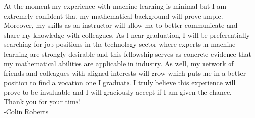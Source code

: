 \documentclass{article}
\begin{document}
At the moment my experience with machine learning is minimal but I am extremely confident that my mathematical background will prove ample. Moreover, my skills as an instructor will allow me to better communicate and share my knowledge with colleagues. As I near graduation, I will be preferentially searching for job positions in the technology sector where experts in machine learning are strongly desirable and this fellowship serves as concrete evidence that my mathematical abilities are applicable in industry. As well, my network of friends and colleagues with aligned interests will grow which puts me in a better position to find a vocation one I graduate. I truly believe this experience will prove to be invaluable and I will graciously accept if I am given the chance. Thank you for your time!\\


\noindent -Colin Roberts
\end{document}
